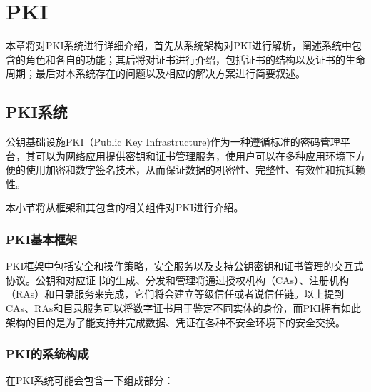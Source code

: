 
\chapter{PKI}

本章将对PKI系统进行详细介绍，首先从系统架构对PKI进行解析，阐述系统中包含的角色和各自的功能；其后将对证书进行介绍，包括证书的结构以及证书的生命周期；最后对本系统存在的问题以及相应的解决方案进行简要叙述。

\section{PKI系统}

公钥基础设施PKI（Public Key Infrastructure)作为一种遵循标准的密码管理平台，其可以为网络应用提供密钥和证书管理服务，使用户可以在多种应用环境下方便的使用加密和数字签名技术，从而保证数据的机密性、完整性、有效性和抗抵赖性。

本小节将从框架和其包含的相关组件对PKI进行介绍。

\subsection{PKI基本框架}

PKI框架中包括安全和操作策略，安全服务以及支持公钥密钥和证书管理的交互式协议。公钥和对应证书的生成、分发和管理将通过授权机构（CAs）、注册机构（RAs）和目录服务来完成\supercite{weise2001public}，它们将会建立等级信任或者说信任链。以上提到CAs、RAs和目录服务可以将数字证书用于鉴定不同实体的身份，而PKI拥有如此架构的目的是为了能支持并完成数据、凭证在各种不安全环境下的安全交换。

\subsection{PKI的系统构成}

在PKI系统可能会包含一下组成部分：

